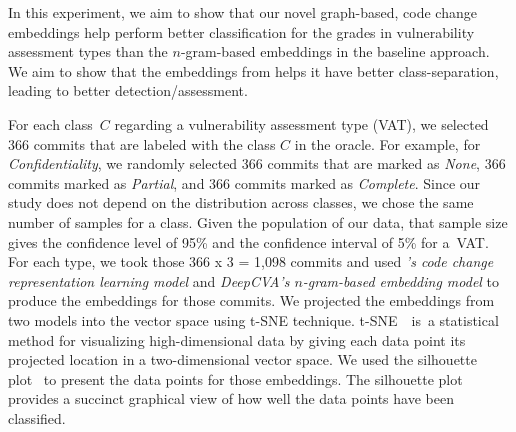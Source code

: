 

In this experiment, we aim to show that our novel graph-based, code
change embeddings help {\tool} perform better classification for the
grades in vulnerability assessment types than the $n$-gram-based
embeddings in the baseline approach. We aim to show that the
embeddings from {\tool} helps it have better class-separation, leading
to better detection/assessment.

For each class~$C$ regarding a vulnerability assessment type (VAT), we
selected 366 commits that are labeled with the class $C$ in the
oracle. For example, for {\em Confidentiality}, we randomly selected
366 commits that are marked as {\em None}, 366 commits marked as {\em
Partial}, and 366 commits marked as {\em Complete}. Since our study
does not depend on the distribution across classes, we chose the same
number of samples for a class. Given the population of our data, that
sample size gives the confidence level of 95\% and the confidence
interval of 5\% for a~VAT.
%
For each type, we took those 366 x 3 = 1,098 commits and used
{\em {\tool}'s code change representation learning model} and {\em DeepCVA's
$n$-gram-based embedding model} to produce the embeddings for
those commits.  We projected the embeddings from two models
into the vector space using t-SNE technique. t-SNE~\cite{tsne}~is~a
statistical method for visualizing high-dimensional data by giving
each data point its projected location in a two-dimensional vector
space. We used the silhouette plot~\cite{silhouette-plot} to
present the data points for those embeddings. The silhouette plot
provides a succinct graphical view of how well the data points have
been classified.

